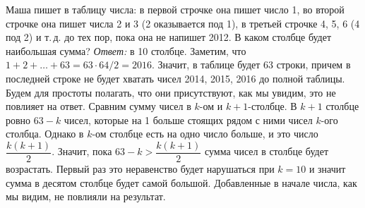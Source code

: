 \problem
Маша пишет в таблицу числа:
в первой строчке она пишет число 1, во второй строчке она пишет числа 2 и 3
(2 оказывается под 1), в третьей строчке 4, 5, 6 (4 под 2) и т.\,д. до тех
пор, пока она не напишет 2012.
В каком столбце будет наибольшая сумма?
\solution
\emph{Ответ:} в 10 столбце.
Заметим, что
$1 + 2 + \ldots + 63 = 63 \cdot 64 / 2 = 2016$.
Значит, в таблице будет 63 строки, причем в последней строке не будет хватать
чисел 2014, 2015, 2016 до полной таблицы.
Будем для простоты полагать, что они присутствуют, как мы увидим, это не
повлияет на ответ.
Сравним сумму чисел в $k$-ом и $k + 1$-столбце.
В $k + 1$ столбце ровно $63 - k$ чисел, которые на 1 больше стоящих рядом с
ними чисел $k$-ого столбца.
Однако в $k$-ом столбце есть на одно число больше, и это число
$\dfrac{k (k + 1)}{2}$.
Значит, пока $63 - k > \dfrac{k (k + 1)}{2}$ сумма чисел в столбце будет
возрастать.
Первый раз это неравенство будет нарушаться при $k = 10$ и значит сумма в
десятом столбце будет самой большой.
Добавленные в начале числа, как мы видим, не повлияли на результат.
\endproblem

